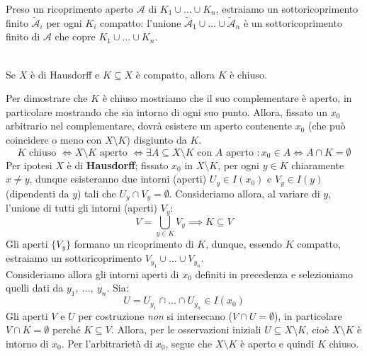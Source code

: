 \begin{lemming}
\end{lemming}
\begin{demonstration}
Preso un ricoprimento aperto $\mathcal{A}$ di $K_1\cup\ldots\cup K_n$, estraiamo un sottoricoprimento finito $\widetilde{\mathcal{A}}_i$ per ogni $K_i$ compatto: l'unione $\widetilde{\mathcal{A}}_1\cup\ldots\cup \widetilde{\mathcal{A}}_n$ è un sottoricoprimento finito di $\mathcal{A}$ che copre $K_1\cup\ldots\cup K_n$.
\end{demonstration}
\begin{theorema}~{}\label{compatto in hausdorff chiuso}\\
Se $X$ è di Hausdorff e $K\subseteq X$ è compatto, allora $K$ è chiuso.
\end{theorema}
\begin{demonstration}
	Per dimostrare che $K$ è chiuso mostriamo che il suo complementare è aperto, in particolare mostrando che sia intorno di ogni suo punto.
	Allora, fissato un $x_0$ arbitrario nel complementare, dovrà esistere un aperto contenente $x_0$ (che può coincidere o meno con $X\setminus K$) disgiunto da $K$.
		\begin{equation*}
				K \text{ chiuso } \iff X\setminus K \text{ aperto } \iff \exists A\subseteq X\setminus K \text{ con } A \text{ aperto } \colon x_0\in A \iff A\cap K=\emptyset
		\end{equation*}
	Per ipotesi $X$ è di \textbf{Hausdorff}; fissato $x_0$ in $X\setminus K$, per ogni $y\in K$ chiaramente $x\neq y$, dunque esisteranno due intorni (aperti) $U_y\in I(x_0)$ e $V_y\in I(y)$ (dipendenti da $y$) tali che $U_y\cap V_y=\emptyset$. Consideriamo allora, al variare di $y$, l'unione di tutti gli intorni (aperti) $V_y$:
	\begin{equation*}
			V=\bigcup_{y\in K}V_y \implies K\subseteq V
	\end{equation*}
	Gli aperti $\{V_y\}$ formano un ricoprimento di $K$, dunque, essendo $K$ compatto, estraiamo un sottoricoprimento $V_{y_1}\cup\ldots\cup V_{y_n}$.\\
	Consideriamo allora gli intorni aperti di $x_0$ definiti in precedenza e selezioniamo quelli dati da $y_1,\ \ldots,\ y_n$. Sia:
	\begin{equation*}
		U=U_{y_1}\cap\ldots\cap U_{y_n} \in I(x_0)
	\end{equation*}
	Gli aperti $V$ e $U$ per costruzione \textit{non} si intersecano ($V\cap U=\emptyset$), in particolare $V\cap K=\emptyset$ perché $K\subseteq V$. Allora, per le osservazioni iniziali $U\subseteq X\setminus K$, cioè $X\setminus K$ è intorno di $x_0$. Per l'arbitrarietà di $x_0$, segue che $X\setminus K$ è aperto e quindi $K$ chiuso.
\end{demonstration}
